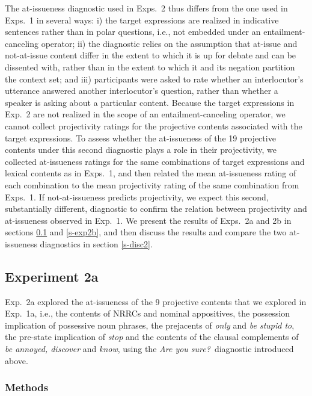 \documentclass[11pt,fleqn]{article}
\newcommand{\6}{\mbox{$[\hspace*{-.6mm}[$}}
\newcommand{\9}{\mbox{$]\hspace*{-.6mm}]$}}
\begin{document}
The at-issueness diagnostic used in Exps.~2 thus differs from the one used in Exps.~1 in several ways: i) the target expressions are realized in indicative sentences rather than in polar questions, i.e., not embedded under an entailment-canceling operator; ii) the diagnostic relies on the assumption that at-issue and not-at-issue content differ in the extent to which it is up for debate and can be dissented with, rather than in the extent to which it and its negation partition the context set; and iii) participants were asked to rate whether an interlocutor's utterance answered another interlocutor's question, rather than whether a speaker is asking about a particular content. Because the target expressions in Exp.~2 are not realized in the scope of an entailment-canceling operator, we cannot collect projectivity ratings for the projective contents associated with the target expressions. To assess whether the at-issueness of the 19 projective contents under this second diagnostic plays a role in their projectivity, we collected at-issueness ratings for the same combinations of target expressions and lexical contents as in Exps.~1, and then related the mean at-issueness rating of each combination to the mean projectivity rating of the same combination from Exps.~1. If not-at-issueness predicts projectivity, we expect this second, substantially different, diagnostic to confirm the relation between projectivity and at-issueness observed in Exp.~1. We present the results of Exps.~2a and 2b in sections \ref{s-exp2a} and \ref{s-exp2b}, and then discuss the results and compare the two at-issueness diagnostics in section \ref{s-disc2}.

\subsection{Experiment 2a}\label{s-exp2a}

Exp.~2a explored the at-issueness of the 9 projective contents that we explored in Exp.~1a, i.e., the contents of NRRCs and nominal appositives, the possession implication of possessive noun phrases, the prejacents of {\em only} and {\em be stupid to}, the pre-state implication of {\em stop} and the contents of the clausal complements of {\em be annoyed, discover} and {\em know}, using the {\em Are you sure?}~diagnostic introduced above.

\subsubsection{Methods}\label{s-methods-2a}
\end{document}
